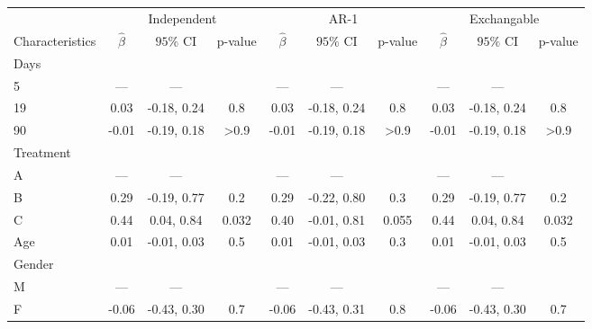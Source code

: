 \begin{table}[!h]
\centering
\begin{tabular}{lccccccccc}
\toprule
\multicolumn{1}{c}{ } & \multicolumn{3}{c}{Independent} & \multicolumn{3}{c}{AR-1} & \multicolumn{3}{c}{Exchangable} \\
\cmidrule(l{3pt}r{3pt}){2-4} \cmidrule(l{3pt}r{3pt}){5-7} \cmidrule(l{3pt}r{3pt}){8-10}
Characteristics & $\widehat\beta$ & $95\%$ CI & p-value & $\widehat\beta$ & $95\%$ CI & p-value & $\widehat\beta$ & $95\%$ CI & p-value\\
\midrule
Days &  &  &  &  &  &  &  &  & \\
5 & — & — &  & — & — &  & — & — & \\
19 & 0.03 & -0.18, 0.24 & 0.8 & 0.03 & -0.18, 0.24 & 0.8 & 0.03 & -0.18, 0.24 & 0.8\\
90 & -0.01 & -0.19, 0.18 & >0.9 & -0.01 & -0.19, 0.18 & >0.9 & -0.01 & -0.19, 0.18 & >0.9\\
Treatment &  &  &  &  &  &  &  &  & \\
\addlinespace
A & — & — &  & — & — &  & — & — & \\
B & 0.29 & -0.19, 0.77 & 0.2 & 0.29 & -0.22, 0.80 & 0.3 & 0.29 & -0.19, 0.77 & 0.2\\
C & 0.44 & 0.04, 0.84 & 0.032 & 0.40 & -0.01, 0.81 & 0.055 & 0.44 & 0.04, 0.84 & 0.032\\
Age & 0.01 & -0.01, 0.03 & 0.5 & 0.01 & -0.01, 0.03 & 0.3 & 0.01 & -0.01, 0.03 & 0.5\\
Gender &  &  &  &  &  &  &  &  & \\
\addlinespace
M & — & — &  & — & — &  & — & — & \\
F & -0.06 & -0.43, 0.30 & 0.7 & -0.06 & -0.43, 0.31 & 0.8 & -0.06 & -0.43, 0.30 & 0.7\\
\bottomrule
\end{tabular}
\end{table}
